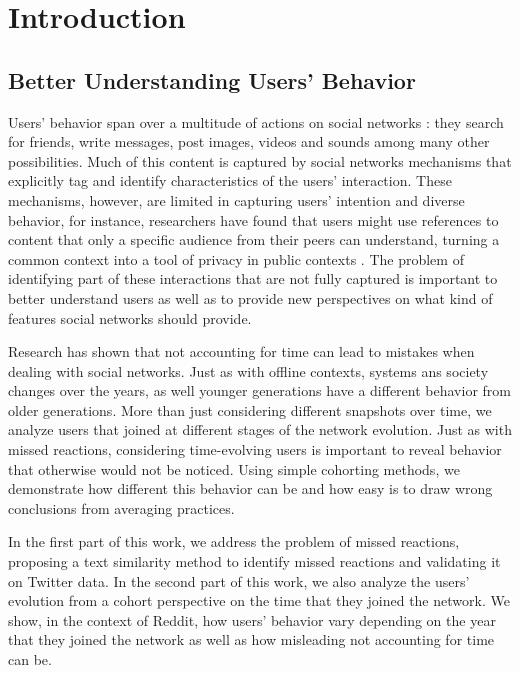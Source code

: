 \chapter{Introduction}


\section{Better Understanding Users' Behavior}

Users' behavior span over a multitude of actions on social networks \cite{Benevenuto2009, Gilbert2009, Comarela2012}: they search for friends, write messages, post images, videos and sounds among many other possibilities. Much of this content is captured by social networks mechanisms that explicitly tag and identify characteristics of the users' interaction. These mechanisms, however, are limited in capturing users' intention and diverse behavior, for instance, researchers have found that users might use references to content that only a specific audience from their peers can understand, turning a common context into a tool of privacy in public contexts \cite{Boyd2011}. The problem of identifying part of these interactions that are not fully captured is important to better understand users as well as to provide new perspectives on what kind of features social networks should provide.

Research has shown that not accounting for time can lead to mistakes when dealing with social networks. Just as with offline contexts, systems ans society changes over the years, as well younger generations have a different behavior from older generations. More than just considering different snapshots over time, we analyze users that joined at different stages of the network evolution. Just as with missed reactions, considering time-evolving users is important to reveal behavior that otherwise would not be noticed. Using simple cohorting methods, we demonstrate how different this behavior can be and how easy is to draw wrong conclusions from averaging practices.

In the first part of this work, we address the problem of missed reactions, proposing a text similarity method to identify missed reactions and validating it on Twitter data. In the second part of this work, we also analyze the users' evolution from a cohort perspective on the time that they joined the network. We show, in the context of Reddit, how users' behavior vary depending on the year that they joined the network as well as how misleading not accounting for time can be. 

